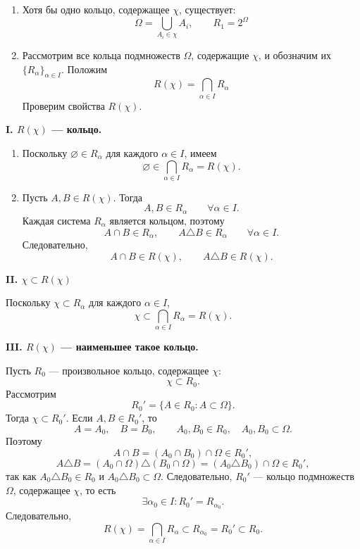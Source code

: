 \begin{Proof}
    \begin{enumerate}[label=\arabic*)]
        \item Хотя бы одно кольцо, содержащее $\chi$, существует:
        \[
            \Omega = \bigcup_{A_i \in \chi} A_i,
            \qquad R_1 = 2^\Omega
        \]

        \item Рассмотрим все кольца подмножеств $\Omega$,
        содержащие $\chi$, и обозначим их
        $\{R_\alpha\}_{\alpha \in I}$. Положим
        \[
            R(\chi) = \bigcap_{\alpha \in I} R_\alpha
        \]
        Проверим свойства $R(\chi)$.
    \end{enumerate}

    \textbf{I. $R(\chi)$ --- кольцо.}
    \begin{enumerate}[label=\arabic*)]
        \item Поскольку $\varnothing \in R_\alpha$
        для каждого $\alpha \in I$, имеем
        \[
            \varnothing \in
            \bigcap_{\alpha \in I} R_\alpha = R(\chi).
        \]

        \item Пусть $A, B \in R(\chi)$. Тогда
        \[
            A, B \in R_\alpha
            \qquad \forall \alpha \in I.
        \]
        Каждая система $R_\alpha$ является кольцом, поэтому
        \[
            A \cap B \in R_\alpha,
            \qquad
            A \triangle B \in R_\alpha
            \qquad \forall \alpha \in I.
        \]
        Следовательно,
        \[
            A \cap B \in R(\chi),
            \qquad
            A \triangle B \in R(\chi).
        \]
    \end{enumerate}

    \textbf{II. $\chi \subset R(\chi)$}

    Поскольку $\chi \subset R_\alpha$ для каждого $\alpha \in I$,
    \[
        \chi \subset \bigcap_{\alpha \in I} R_\alpha = R(\chi).
    \]

    \textbf{III. $R(\chi)$ --- наименьшее такое кольцо.}

Пусть $R_0$ --- произвольное кольцо, содержащее $\chi$:
\[
    \chi \subset R_0.
\]
Рассмотрим
\[
    R_0' = \{A \in R_0 \colon A \subset \Omega\}.
\]
Тогда $\chi \subset R_0'$. Если $A,B \in R_0'$, то
\[
    A=A_0,\quad B=B_0,\qquad
    A_0,B_0\in R_0,\quad A_0,B_0\subset\Omega.
\]
Поэтому
\[
    A\cap B=(A_0\cap B_0)\cap\Omega\in R_0',
\]
\[
    A\triangle B
    =(A_0\cap\Omega)\triangle(B_0\cap\Omega)
    =(A_0\triangle B_0)\cap\Omega\in R_0',
\]
так как $A_0\triangle B_0\in R_0$ и
$A_0\triangle B_0\subset\Omega$.
Следовательно, $R_0'$ --- кольцо подмножеств $\Omega$,
содержащее $\chi$, то есть
\[
    \exists \alpha_0 \in I \colon R_0' = R_{\alpha_0}.
\]
Следовательно,
\[
    R(\chi) = \bigcap_{\alpha \in I} R_\alpha
    \subset R_{\alpha_0} = R_0' \subset R_0.
\]
\end{Proof}

